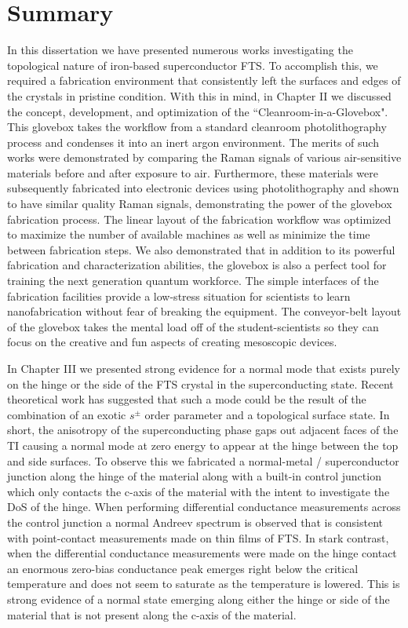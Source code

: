 \section{Summary}
In this dissertation we have presented numerous works investigating the topological nature of iron-based superconductor \acl{FTS}. To accomplish this, we required a fabrication environment that consistently left the surfaces and edges of the crystals in pristine condition. With this in mind, in Chapter II we discussed the concept, development, and optimization of the ``Cleanroom-in-a-Glovebox". This glovebox takes the workflow from a standard cleanroom photolithography process and condenses it into an inert argon environment. The merits of such works were demonstrated by comparing the Raman signals of various air-sensitive materials before and after exposure to air. Furthermore, these materials were subsequently fabricated into electronic devices using photolithography and shown to have similar quality Raman signals, demonstrating the power of the glovebox fabrication process. The linear layout of the fabrication workflow was optimized to maximize the number of available machines as well as minimize the time between fabrication steps. We also demonstrated that in addition to its powerful fabrication and characterization abilities, the glovebox is also a perfect tool for training the next generation quantum workforce. The simple interfaces of the fabrication facilities provide a low-stress situation for scientists to learn nanofabrication without fear of breaking the equipment. The conveyor-belt layout of the glovebox takes the mental load off of the student-scientists so they can focus on the creative and fun aspects of creating mesoscopic devices.\par
In Chapter III we presented strong evidence for a normal mode that exists purely on the hinge or the side of the \ac{FTS} crystal in the superconducting state. Recent theoretical work has suggested that such a mode could be the result of the combination of an exotic $s^{\pm}$ order parameter and a topological surface state. In short, the anisotropy of the superconducting phase gaps out adjacent faces of the \ac{TI} causing a normal mode at zero energy to appear at the hinge between the top and side surfaces. To observe this we fabricated a normal-metal / superconductor junction along the hinge of the material along with a built-in control junction which only contacts the c-axis of the material with the intent to investigate the \ac{DoS} of the hinge. When performing differential conductance measurements across the control junction a normal Andreev spectrum is observed that is consistent with point-contact measurements made on thin films of \ac{FTS}. In stark contrast, when the differential conductance measurements were made on the hinge contact an enormous zero-bias conductance peak emerges right below the critical temperature and does not seem to saturate as the temperature is lowered. This is strong evidence of a normal state emerging along either the hinge or side of the material that is not present along the c-axis of the material.\par
